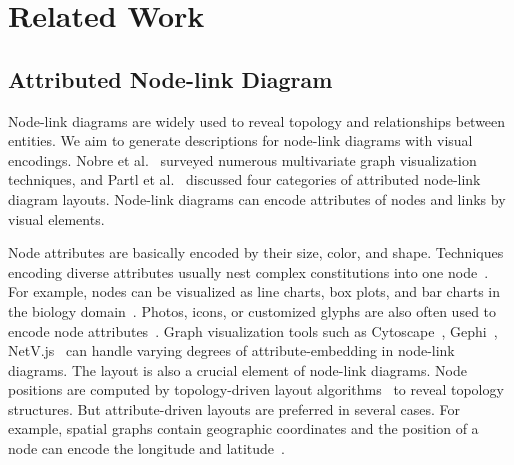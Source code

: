 \section{Related Work}\label{sec:relatedwork}
\subsection{Attributed Node-link Diagram}
Node-link diagrams are widely used to reveal topology and relationships between entities.
We aim to generate descriptions for node-link diagrams with visual encodings.
Nobre et al.~\cite{DBLP:journals/cgf/NobreMSL19} surveyed numerous multivariate graph visualization techniques,
and Partl et al.~\cite{DBLP:conf/biovis/PartlKLKSS12} discussed four categories of attributed node-link diagram layouts.
Node-link diagrams can encode attributes of nodes and links by visual elements.

Node attributes are basically encoded by their size, color, and shape.
Techniques encoding diverse attributes usually nest complex constitutions into one node~\cite{DBLP:conf/infovis/AuberCJM03}.
For example, nodes can be visualized as line charts, box plots, and bar charts in the biology domain~\cite{gehlenborg2010visualization, DBLP:conf/iv/JusufiDK10}.
Photos, icons, or customized glyphs are also often used to encode node attributes~\cite{DBLP:conf/chi/DunneS13}.
Graph visualization tools such as Cytoscape~\cite{DBLP:journals/bioinformatics/FranzLHDSB16}, Gephi~\cite{DBLP:conf/icwsm/BastianHJ09}, NetV.js~\cite{HAN2021} can handle varying degrees of attribute-embedding in node-link diagrams.
The layout is also a crucial element of node-link diagrams.
Node positions are computed by topology-driven layout algorithms~\cite{DBLP:journals/spe/FruchtermanR91, DBLP:journals/cgf/KruigerRMKKT17, DBLP:journals/tvcg/GansnerHN13, DBLP:journals/tvcg/ZhuCHHLZ21} to reveal topology structures.
But attribute-driven layouts are preferred in several cases.
For example, spatial graphs contain geographic coordinates and the position of a node can encode the longitude and latitude~\cite{DBLP:journals/tvcg/ElzenW14, DBLP:journals/tvcg/Guo09}.

